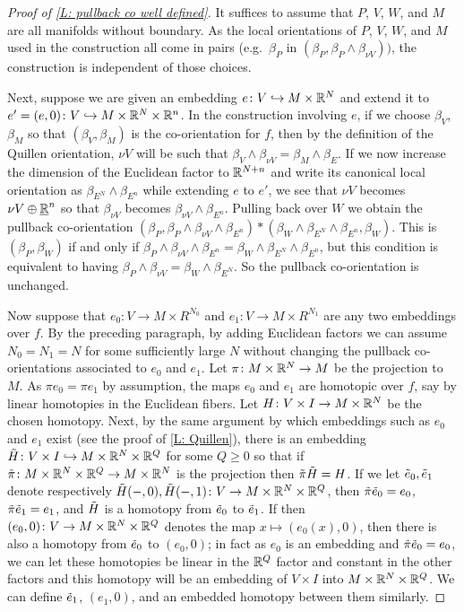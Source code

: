 \begin{proof}[Proof of \cref{L: pullback co well defined}]
	It suffices to assume that $P$, $V$, $W$, and $M$ are all manifolds without boundary.
	As the local orientations of $P$, $V$, $W$, and $M$ used in the construction all come in pairs (e.g.\ $\beta_P$ in $(\beta_P,\beta_P \wedge \beta_{\nu V}))$, the construction is independent of those choices.

	Next, suppose we are given an embedding $e \colon V \hookrightarrow M \times \mathbb{R}^N$ and extend it to $e' = (e,0) \colon V \hookrightarrow M \times \mathbb{R}^N \times \mathbb{R}^n$.
	In the construction involving $e$, if we choose $\beta_V$, $\beta_M$ so that $(\beta_V,\beta_M)$ is the co-orientation for $f$, then by the definition of the Quillen orientation, $\nu V$ will be such that $\beta_V \wedge \beta_{\nu V} = \beta_M \wedge \beta_E$.
	If we now increase the dimension of the Euclidean factor to $\mathbb{R}^{N+n}$ and write its canonical local orientation as $\beta_{E^N} \wedge \beta_{E^n}$ while extending $e$ to $e'$, we see that $\nu V$ becomes $\nu V \oplus \underline{\mathbb{R}}^n$ so that $\beta_{\nu V}$ becomes $\beta_{\nu V} \wedge \beta_{E^n}$.
	Pulling back over $W$ we obtain the pullback co-orientation $(\beta_P,\beta_P \wedge \beta_{\nu V} \wedge \beta_{E^n})*(\beta_W \wedge \beta_{E^N} \wedge \beta_{E^n},\beta_W)$.
	This is $(\beta_P,\beta_W)$ if and only if $\beta_P \wedge \beta_{\nu V} \wedge \beta_{E^n} = \beta_W \wedge \beta_{E^N} \wedge \beta_{E^n}$, but this condition is equivalent to having $\beta_P \wedge \beta_{\nu V} = \beta_W \wedge \beta_{E^N}$.
	So the pullback co-orientation is unchanged.

	Now suppose that $e_0 \colon V \to M \times R^{N_0}$ and $e_1 \colon V \to M \times R^{N_1}$ are any two embeddings over $f$.
	By the preceding paragraph, by adding Euclidean factors we can assume $N_0 = N_1 = N$ for some sufficiently large $N$ without changing the pullback co-orientations associated to $e_0$ and $e_1$.
	Let $\pi \colon M \times \mathbb{R}^N \to M$ be the projection to $M$.
	As $\pi e_0 = \pi e_1$ by assumption, the maps $e_0$ and $e_1$ are homotopic over $f$, say by linear homotopies in the Euclidean fibers.
	Let $H \colon V \times I \to M \times \mathbb{R}^N$ be the chosen homotopy.
	Next, by the same argument by which embeddings such as $e_0$ and $e_1$ exist (see the proof of \cref{L: Quillen}), there is an embedding $\tilde H \colon V \times I \hookrightarrow M \times \mathbb{R}^N \times \mathbb{R}^Q$ for some $Q \geq 0$ so that if $\tilde \pi \colon M \times \mathbb{R}^N \times \mathbb{R}^Q \to M \times \mathbb{R}^N$ is the projection then $\tilde \pi \tilde H = H$.
	If we let $\tilde e_0, \tilde e_1$ denote respectively $\tilde H(-,0), \tilde H(-,1) \colon V \to M \times \mathbb{R}^N \times \mathbb{R}^Q$, then $\tilde \pi \tilde e_0 = e_0$, $\tilde \pi \tilde e_1 = e_1$, and $\tilde H$ is a homotopy from $\tilde e_0$ to $\tilde e_1$.
	If then $(e_0,0) \colon V \to M \times \mathbb{R}^N \times \mathbb{R}^Q$ denotes the map $x \mapsto (e_0(x),0)$, then there is also a homotopy from $\tilde e_0$ to $(e_0,0)$; in fact as $e_0$ is an embedding and $\tilde \pi \tilde e_0 = e_0$, we can let these homotopies be linear in the $\mathbb{R}^Q$ factor and constant in the other factors and this homotopy will be an embedding of $V \times I$ into $M\times \mathbb{R}^N \times \mathbb{R}^Q$.
	We can define $\tilde e_1$, $(e_1,0)$, and an embedded homotopy between them similarly.


\end{proof}

